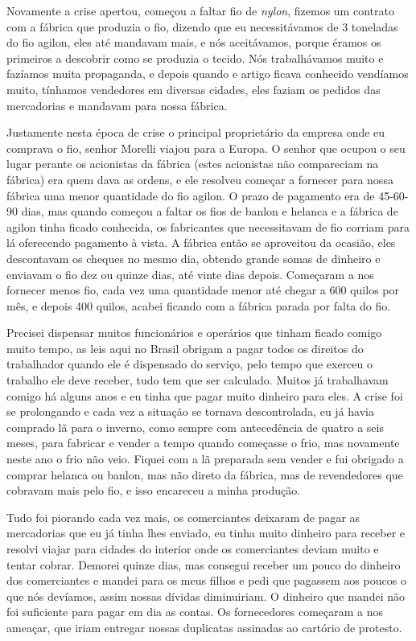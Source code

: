 Novamente a crise apertou, começou a faltar fio de \textit{nylon}, fizemos um
contrato com a fábrica que produzia o fio, dizendo que eu necessitávamos
de 3 toneladas do fio agilon, eles até mandavam mais, e nós aceitávamos,
porque éramos os primeiros a descobrir como se produzia o tecido. Nós
trabalhávamos muito e fazíamos muita propaganda, e depois quando e
artigo ficava conhecido vendíamos muito, tínhamos vendedores em diversas
cidades, eles faziam os pedidos das mercadorias e mandavam para nossa
fábrica.

Justamente nesta época de crise o principal proprietário da empresa onde
eu comprava o fio, senhor Morelli viajou para a Europa. O senhor que
ocupou o seu lugar perante os acionistas da fábrica (estes acionistas
não compareciam na fábrica) era quem dava as ordens, e ele resolveu
começar a fornecer para nossa fábrica uma menor quantidade do fio
agilon. O prazo de pagamento era de 45-60-90 dias, mas quando começou a
faltar os fios de banlon e helanca e a fábrica de agilon tinha ficado
conhecida, os fabricantes que necessitavam de fio corriam para lá
oferecendo pagamento à vista. A fábrica então se aproveitou da ocasião,
eles descontavam os cheques no mesmo dia, obtendo grande somas de
dinheiro e enviavam o fio dez ou quinze dias, até vinte dias depois.
Começaram a nos fornecer menos fio, cada vez uma quantidade menor até
chegar a 600 quilos por mês, e depois 400 quilos, acabei ficando com a
fábrica parada por falta do fio.

Precisei dispensar muitos funcionários e operários que tinham ficado
comigo muito tempo, as leis aqui no Brasil obrigam a pagar todos os
direitos do trabalhador quando ele é dispensado do serviço, pelo tempo
que exerceu o trabalho ele deve receber, tudo tem que ser calculado.
Muitos já trabalhavam comigo há alguns anos e eu tinha que pagar muito
dinheiro para eles. A crise foi se prolongando e cada vez a situação se
tornava descontrolada, eu já havia comprado lã para o inverno, como
sempre com antecedência de quatro a seis meses, para fabricar e vender a
tempo quando começasse o frio, mas novamente neste ano o frio não veio.
Fiquei com a lã preparada sem vender e fui obrigado a comprar helanca ou
banlon, mas não direto da fábrica, mas de revendedores que cobravam mais
pelo fio, e isso encareceu a minha produção.

Tudo foi piorando cada vez mais, os comerciantes deixaram de pagar as
mercadorias que eu já tinha lhes enviado, eu tinha muito dinheiro para
receber e resolvi viajar para cidades do interior onde os comerciantes
deviam muito e tentar cobrar. Demorei quinze dias, mas consegui receber
um pouco do dinheiro dos comerciantes e mandei para os meus filhos e
pedi que pagassem aos poucos o que nós devíamos, assim nossas dívidas
diminuiriam. O dinheiro que mandei não foi suficiente para pagar em dia
as contas. Os fornecedores começaram a nos ameaçar, que iriam entregar
nossas duplicatas assinadas ao cartório de protesto.

